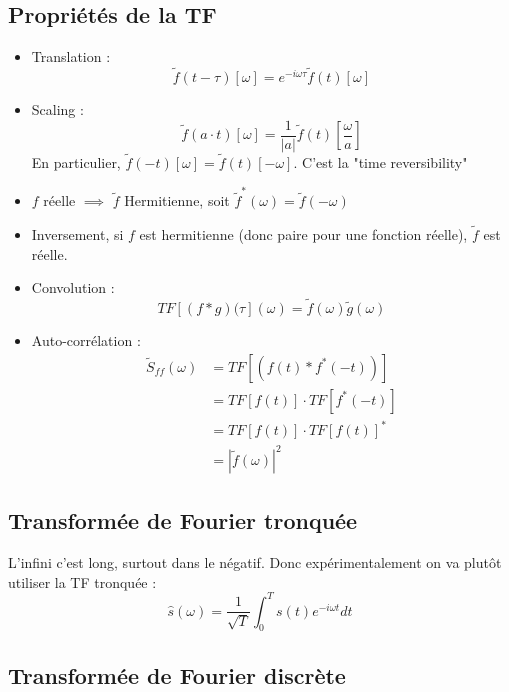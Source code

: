 \documentclass[a4paper]{report}
\begin{document}
  \subsection{Propriétés de la TF}
  \begin{itemize}
  \item Translation : \begin{equation}
  \tilde{f}(t-\tau)[\omega]=e^{-i\omega \tau} \tilde{f}(t)[\omega]
  \end{equation}
  \item Scaling : \begin{equation}
  \tilde{f}(a\cdot t)[\omega]= \dfrac{1}{|a|} \tilde{f}(t)[\dfrac{\omega}{a}]
  \end{equation}
  En particulier, $\tilde{f}(-t)[\omega]=\tilde{f}(t)[-\omega]$. C'est la "time reversibility"
  \item $f$ réelle $\implies$ $\tilde f$ Hermitienne, soit $\tilde f^*(\omega)= \tilde f(-\omega)$
  \item Inversement, si $f$ est hermitienne (donc paire pour une fonction réelle), $\tilde{f}$ est réelle.
  \item Convolution : 
  \begin{equation}
  TF[(f*g)(\tau](\omega)=\tilde{f}(\omega)\tilde{g}(\omega)
  \end{equation}
  \item Auto-corrélation : \begin{align*}
  \tilde S_{ff}(\omega)&=TF[(f(t)*f^*(-t))] \\
  &=TF[f(t)] \cdot TF[f^*(-t)] \\
  &= TF[f(t)] \cdot TF[f(t)]^* \\
  &= |\tilde{f}(\omega)|^2
  \end{align*}
   
  \end{itemize}
  \subsection{Transformée de Fourier tronquée}
  L'infini c'est long, surtout dans le négatif. Donc expérimentalement on va plutôt utiliser la TF tronquée : 
  \begin{equation}
  \hat{s}(\omega)=\dfrac{1}{\sqrt{T}}\int_{0}^{T} s(t) e^{-i\omega t} dt
  \end{equation}
  \subsection{Transformée de Fourier discrète}
\end{document}
